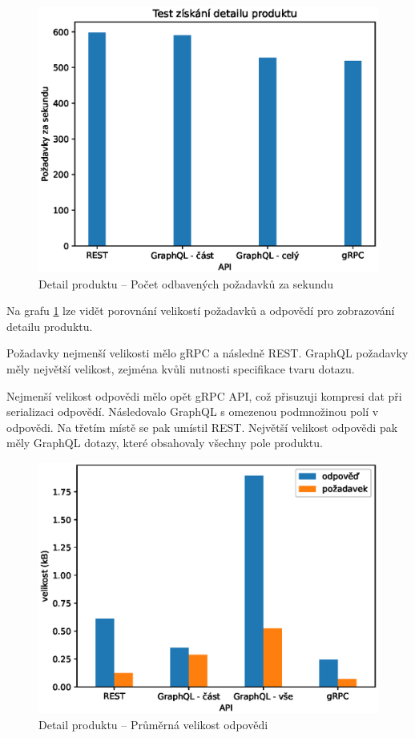 \documentclass[thesis=M,czech]{FITthesis}[2019/12/23]
\begin{document}
\begin{figure}[H]
  \includegraphics[width=\linewidth]{img/get-product.eps}
  \caption{Detail produktu -- Počet odbavených požadavků za sekundu}
\label{test_get_product}
\end{figure}

Na grafu \ref{test_get_product} lze vidět porovnání velikostí požadavků a odpovědí pro zobrazování detailu produktu.

Požadavky nejmenší velikosti mělo gRPC a následně REST. GraphQL požadavky měly největší velikost, zejména kvůli nutnosti specifikace tvaru dotazu. 

Nejmenší velikost odpovědi mělo opět gRPC API, což přisuzuji kompresi dat při serializaci odpovědí. Následovalo GraphQL s omezenou podmnožinou polí v odpovědi. Na třetím místě se pak umístil REST. Největší velikost odpovědi pak měly GraphQL dotazy, které obsahovaly všechny pole produktu.

\begin{figure}[H]
  \includegraphics[width=\linewidth]{img/req-size.eps}
  \caption{Detail produktu -- Průměrná velikost odpovědi}
\label{test_get_product_size}
\end{figure}
\end{document}
